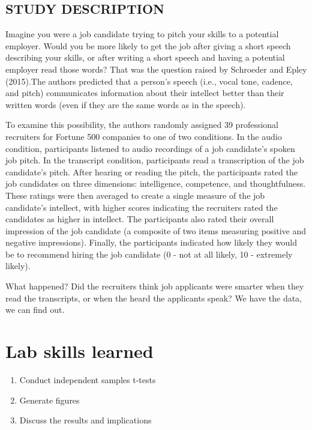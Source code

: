 \documentclass[]{book}
\providecommand{\tightlist}{%
  \setlength{\itemsep}{0pt}\setlength{\parskip}{0pt}}
\theoremstyle{definition}
\theoremstyle{definition}
\theoremstyle{definition}
\theoremstyle{remark}
\begin{document}
\subsection{STUDY DESCRIPTION}\label{study-description-1}

Imagine you were a job candidate trying to pitch your skills to a
potential employer. Would you be more likely to get the job after giving
a short speech describing your skills, or after writing a short speech
and having a potential employer read those words? That was the question
raised by Schroeder and Epley (2015).The authors predicted that a
person's speech (i.e., vocal tone, cadence, and pitch) communicates
information about their intellect better than their written words (even
if they are the same words as in the speech).

To examine this possibility, the authors randomly assigned 39
professional recruiters for Fortune 500 companies to one of two
conditions. In the audio condition, participants listened to audio
recordings of a job candidate's spoken job pitch. In the transcript
condition, participants read a transcription of the job candidate's
pitch. After hearing or reading the pitch, the participants rated the
job candidates on three dimensions: intelligence, competence, and
thoughtfulness. These ratings were then averaged to create a single
measure of the job candidate's intellect, with higher scores indicating
the recruiters rated the candidates as higher in intellect. The
participants also rated their overall impression of the job candidate (a
composite of two items measuring positive and negative impressions).
Finally, the participants indicated how likely they would be to
recommend hiring the job candidate (0 - not at all likely, 10 -
extremely likely).

What happened? Did the recruiters think job applicants were smarter when
they read the transcripts, or when the heard the applicants speak? We
have the data, we can find out.

\section{Lab skills learned}\label{lab-skills-learned-1}

\begin{enumerate}
\def\labelenumi{\arabic{enumi}.}
\tightlist
\item
  Conduct independent samples t-tests
\item
  Generate figures
\item
  Discuss the results and implications
\end{enumerate}
\end{document}
